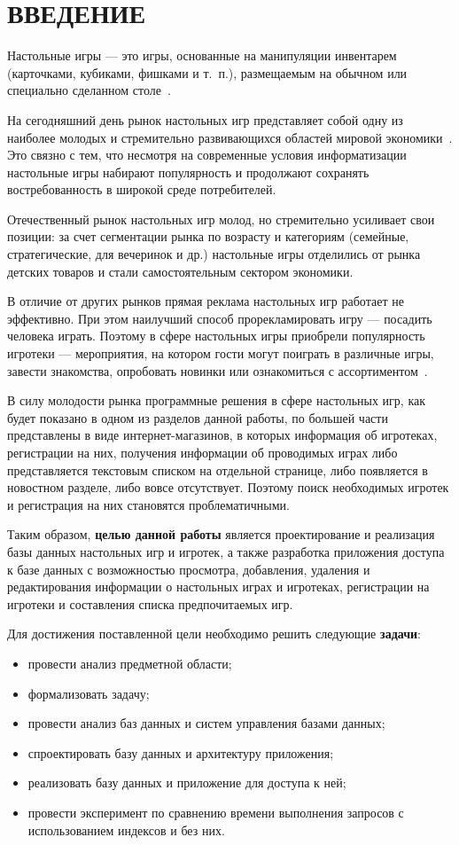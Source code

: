 \chapter*{ВВЕДЕНИЕ}

Настольные игры --- это игры, основанные на манипуляции инвентарем (карточками,
кубиками, фишками и т.~п.), размещаемым на обычном или специально сделанном
столе~\cite{art01}.

На сегодняшний день рынок настольных игр представляет собой одну из наиболее
молодых и стремительно развивающихся областей мировой
экономики~\cite{art02}. Это связно с тем, что несмотря на современные условия
информатизации настольные игры набирают популярность и продолжают сохранять
востребованность в широкой среде потребителей.

Отечественный рынок настольных игр молод, но стремительно усиливает свои
позиции: за счет сегментации рынка по возрасту и категориям (семейные,
стратегические, для вечеринок и др.) настольные игры отделились от рынка
детских товаров и стали самостоятельным сектором экономики.

В отличие от других рынков прямая реклама настольных игр работает не эффективно.
При этом наилучший способ прорекламировать игру --- посадить человека играть.
Поэтому в сфере настольных игры приобрели популярность игротеки --- мероприятия,
на котором гости могут поиграть в различные игры, завести знакомства, опробовать
новинки или ознакомиться с ассортиментом~\cite{art03}.

В силу молодости рынка программные решения в сфере настольных игр, как будет
показано в одном из разделов данной работы, по большей части представлены в виде
интернет-магазинов, в которых информация об игротеках, регистрации на них,
получения информации об проводимых играх либо представляется текстовым списком
на отдельной странице, либо появляется в новостном разделе, либо вовсе
отсутствует.  Поэтому поиск необходимых игротек и регистрация на них становятся
проблематичными.

Таким образом, \textbf{целью данной работы} является проектирование и реализация
базы данных настольных игр и игротек, а также разработка приложения доступа к
базе данных с возможностью просмотра, добавления, удаления и редактирования
информации о настольных играх и игротеках, регистрации на игротеки и составления
списка предпочитаемых игр.

Для достижения поставленной цели необходимо решить следующие \textbf{задачи}:
\begin{itemize}
    \item провести анализ предметной области;
    \item формализовать задачу;
    \item провести анализ баз данных и систем управления базами данных;
    \item спроектировать базу данных и архитектуру приложения;
    \item реализовать базу данных и приложение для доступа к ней;
    \item провести эксперимент по сравнению времени выполнения запросов с
        использованием индексов и без них.
\end{itemize}

